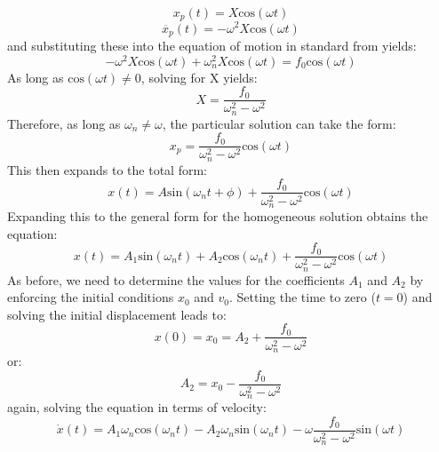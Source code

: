 \documentclass[12pt,letter]{article}
\numberwithin{ex}{section} %
\numberwithin{re}{section} %
\begin{document}
			\begin{equation}
				x_p(t) = X\text{cos}(\omega t)
			\end{equation}	
			\begin{equation}
				\ddot{x_p}(t) = -\omega^2X\text{cos}(\omega t)
			\end{equation}				
			and substituting these into the equation of motion in standard from yields:
			\begin{equation}
				-\omega^2X\text{cos}(\omega t)+\omega_n^2X\text{cos}(\omega t) = f_0\text{cos}(\omega t)
			\end{equation}		
			As long as 	$\text{cos}(\omega t) \neq  0$, solving for X yields:
			\begin{equation}
				X = \frac{f_0}{\omega_n^2-\omega^2}
			\end{equation}		
			Therefore, as long as $\omega_n \neq \omega$, the particular solution can take the form:
			\begin{equation}
				x_p = \frac{f_0}{\omega_n^2-\omega^2}\text{cos}(\omega t)
			\end{equation}						
			This then expands to the total form:
			\begin{equation}
				x(t) = A\text{sin}(\omega_n t + \phi) + \frac{f_0}{\omega_n^2-\omega^2}\text{cos}(\omega t)
			\end{equation}				
			Expanding this to the general form for the homogeneous solution obtains the equation:
			\begin{equation}
				x(t) = A_1\text{sin}(\omega_n t) + A_2\text{cos}(\omega_n t) + \frac{f_0}{\omega_n^2-\omega^2}\text{cos}(\omega t)
			\end{equation}				
			As before, we need to determine the values for the coefficients $A_1$ and $A_2$ by enforcing the initial conditions $x_0$ and $v_0$. Setting the time to zero ($t=0$) and solving the initial displacement leads to:
			\begin{equation}
				x(0) = x_0 = A_2 + \frac{f_0}{\omega_n^2-\omega^2}
			\end{equation}				
			or:
			\begin{equation}
				A_2 = x_0-\frac{f_0}{\omega_n^2-\omega^2}
			\end{equation}	
			again, solving the equation in terms of velocity:
			\begin{equation}
				\dot{x}(t) = A_1\omega_n\text{cos}(\omega_n t) - A_2 \omega_n \text{sin}(\omega_n t) - \omega \frac{f_0}{\omega_n^2-\omega^2}\text{sin}(\omega t)
			\end{equation}	
\end{document}
